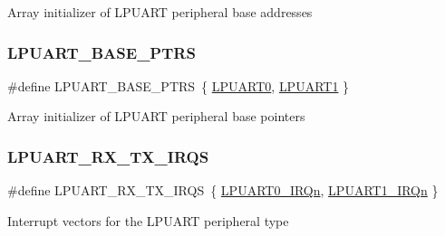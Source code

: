 Array initializer of L\+P\+U\+A\+RT peripheral base addresses \mbox{\label{group___l_p_u_a_r_t___peripheral___access___layer_ga23d9c24323d49602ca4e69ed873982de}} 
\subsubsection{\texorpdfstring{LPUART\_BASE\_PTRS}{LPUART\_BASE\_PTRS}}
{\footnotesize\ttfamily \#define L\+P\+U\+A\+R\+T\+\_\+\+B\+A\+S\+E\+\_\+\+P\+T\+RS~\{ \mbox{\hyperlink{group___l_p_u_a_r_t___peripheral___access___layer_ga5b2895bb50a19a21ddb954c28977629b}{L\+P\+U\+A\+R\+T0}}, \mbox{\hyperlink{group___l_p_u_a_r_t___peripheral___access___layer_ga73eb37d103f4e4f2d18ec3d3f5208ab9}{L\+P\+U\+A\+R\+T1}} \}}

Array initializer of L\+P\+U\+A\+RT peripheral base pointers \mbox{\label{group___l_p_u_a_r_t___peripheral___access___layer_ga5fc5deafd2728edf687f15b780aa116b}} 
\subsubsection{\texorpdfstring{LPUART\_RX\_TX\_IRQS}{LPUART\_RX\_TX\_IRQS}}
{\footnotesize\ttfamily \#define L\+P\+U\+A\+R\+T\+\_\+\+R\+X\+\_\+\+T\+X\+\_\+\+I\+R\+QS~\{ \mbox{\hyperlink{group___interrupt__vector__numbers_gga666eb0caeb12ec0e281415592ae89083a4a7d033e6cb46a64b460f9c2383e681e}{L\+P\+U\+A\+R\+T0\+\_\+\+I\+R\+Qn}}, \mbox{\hyperlink{group___interrupt__vector__numbers_gga666eb0caeb12ec0e281415592ae89083af5ac0e39fc168694d2b7d39018c6cc0a}{L\+P\+U\+A\+R\+T1\+\_\+\+I\+R\+Qn}} \}}

Interrupt vectors for the L\+P\+U\+A\+RT peripheral type 